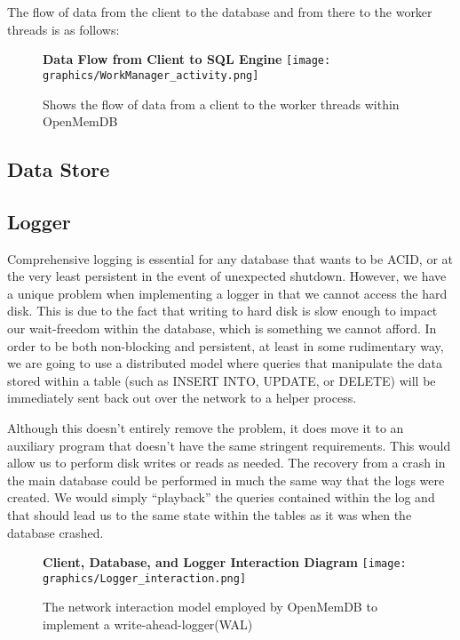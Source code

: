 \documentclass[letterpaper, 12pt]{article}
\begin{document}
  The flow of data from the client to the database and from there to the worker threads
  is as follows:
  \begin{figure}
   \centering
   \textbf{Data Flow from Client to SQL Engine}
   \texttt{[image: graphics/WorkManager\_activity.png]}
   \caption{Shows the flow of data from a client to the worker threads within OpenMemDB}
  \end{figure}

  \subsection{Data Store}

  \subsection{Logger}
  Comprehensive logging is essential for any database that wants to be ACID, or
  at the very least persistent in the event of unexpected shutdown. However, we
  have a unique problem when implementing a logger in that we cannot access the
  hard disk. This is due to the fact that writing to hard disk is slow enough to
  impact our wait-freedom within the database, which is something we cannot afford.
  In order to be both non-blocking and persistent, at least in some rudimentary way,
  we are going to use a distributed model where queries that manipulate the data
  stored within a table (such as INSERT INTO, UPDATE, or DELETE) will be immediately
  sent back out over the network to a helper process.
  \par\vspace{\baselineskip}
  Although this doesn't entirely remove the problem, it does move it to an auxiliary
  program that doesn't have the same stringent requirements. This would allow us to
  perform disk writes or reads as needed. The recovery from a crash in the main database
  could be performed in much the same way that the logs were created. We would simply
  ``playback'' the queries contained within the log and that should lead us to the same
  state within the tables as it was when the database crashed.
  \begin{figure}
    \centering
    \textbf{Client, Database, and Logger Interaction Diagram}
    \texttt{[image: graphics/Logger\_interaction.png]}
    \caption{The network interaction model employed by OpenMemDB to implement a
	     write-ahead-logger(WAL)}
  \end{figure}
\end{document}
